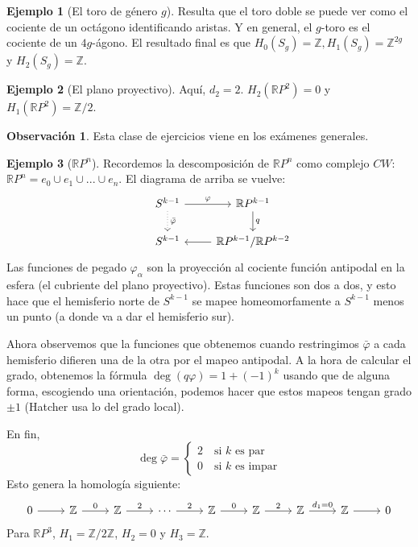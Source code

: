 \documentclass[spanish]{book}
\theoremstyle{definition}
\newtheorem*{obs}{Observación}
\newtheorem*{ejem}{Ejemplo}
\newcommand{\R}{\mathbb{R}}
\newcommand{\Z}{\mathbb{Z}}
\begin{document}
	\begin{ejem}[El toro de género $g$]
		Resulta que el toro doble se puede ver como el cociente de un octágono identificando aristas. Y en general, el $g$-toro es el cociente de un $4g$-ágono. El resultado final es que $H_0(S_g)=\Z, H_1(S_g)=\Z^{2g}$ y $H_2(S_g)=\Z$.
	\end{ejem}
	\begin{ejem}[El plano proyectivo]
		Aquí, $d_2=2$. $H_2(\R P^2)=0$ y $H_1(\R P^2)=\Z/2$.
	\end{ejem}
	\begin{obs}
		Esta clase de ejercicios viene en los exámenes generales.
	\end{obs}
	\begin{ejem}[$\R P^n$]
		Recordemos la descomposición de $\R P^n$ como complejo $CW$: $\R P^n=e_0\cup e_1\cup...\cup e_n$. El diagrama de arriba se vuelve:
		\[\begin{tikzcd}
			& S^{k-1} \arrow[r, "\varphi"] \arrow[d, dotted, "\bar\varphi"] & \mathbb{R}P^{k-1} \arrow[d, "q"] \\
			& S^{k-1} & \mathbb{R}P^{k-1}/\mathbb{R}P^{k-2} \arrow[l]
		\end{tikzcd}\]
		Las funciones de pegado $\varphi_\alpha$ son la proyección al cociente función antipodal en la esfera (el cubriente del plano proyectivo). Estas funciones son dos a dos, y esto hace que el hemisferio norte de $S^{k-1}$ se mapee homeomorfamente a $S^{k-1}$ menos un punto (a donde va a dar el hemisferio sur).
		
		Ahora observemos que la funciones que obtenemos cuando restringimos $\bar\varphi$ a cada hemisferio difieren una de la otra por el mapeo antipodal. A la hora de calcular el grado, obtenemos la fórmula $\deg (q\varphi)=1+(-1)^k$ usando que de alguna forma, escogiendo una orientación, podemos hacer que estos mapeos tengan grado $\pm1$ (Hatcher usa lo del grado local).
		
		En fin,
		\[\deg\bar\varphi=\begin{cases}2\quad\text{si }k\text{ es par}\\0\quad\text{si }k\text{ es impar}\end{cases}\]
		Esto genera la homología siguiente:
		\[\begin{tikzcd}
			0 \arrow[r] & \mathbb{Z} \arrow[r, "0"] & \mathbb{Z} \arrow[r, "2"] & \cdots \arrow[r, "2"] & \mathbb{Z} \arrow[r, "0"] & \mathbb{Z} \arrow[r, "2"] & \mathbb{Z} \arrow[r, "d_1=0"] & \mathbb{Z} \arrow[r] & 0
		\end{tikzcd}\]
		Para $\R P^3$, $H_1=\Z/2\Z$, $H_2=0$ y $H_3=\Z$.
	\end{ejem}
\end{document}
